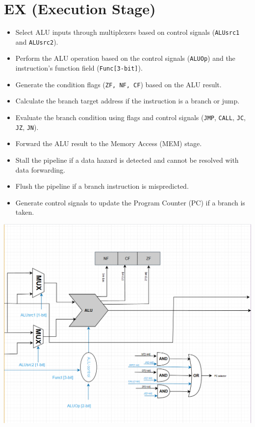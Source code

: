 \documentclass{report}
\begin{document}
\section*{EX (Execution Stage)}
\begin{minipage}{0.6\textwidth}
\begin{itemize}
    \item Select ALU inputs through multiplexers based on control signals (\texttt{ALUsrc1} and \texttt{ALUsrc2}).
    \item Perform the ALU operation based on the control signals (\texttt{ALUOp}) and the instruction’s function field (\texttt{Func[3-bit]}).
    \item Generate the condition flags (\texttt{ZF, NF, CF}) based on the ALU result.
    \item Calculate the branch target address if the instruction is a branch or jump.
    \item Evaluate the branch condition using flags and control signals (\texttt{JMP}, \texttt{CALL}, \texttt{JC}, \texttt{JZ}, \texttt{JN}).
    \item Forward the ALU result to the Memory Access (MEM) stage.
    \item Stall the pipeline if a data hazard is detected and cannot be resolved with data forwarding.
    \item Flush the pipeline if a branch instruction is mispredicted.
    \item Generate control signals to update the Program Counter (PC) if a branch is taken.
\end{itemize}
\end{minipage}
\begin{minipage}{0.35\textwidth}
\begin{center}
    \includegraphics[width=\textwidth]{./assets/EX.png}
\end{center}
\end{minipage}
\end{document}
